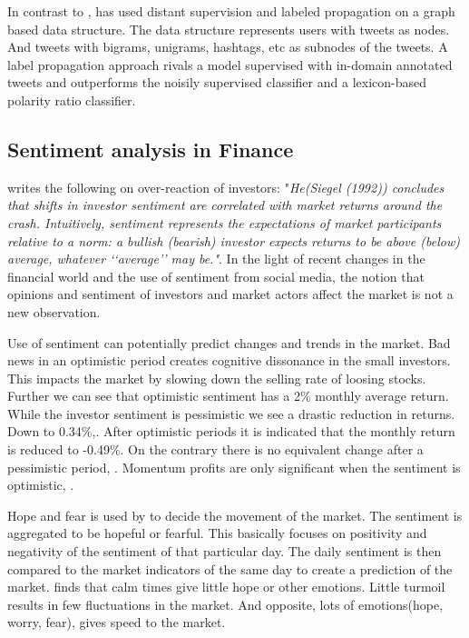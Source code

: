 In contrast to \cite[]{becker13}, \cite[]{sperious11} has used distant
supervision and labeled propagation on a graph based data structure. The data
structure represents users with tweets as nodes. And tweets with bigrams,
unigrams, hashtags, etc as subnodes of the tweets. A label propagation approach
rivals a model supervised with in-domain annotated tweets and outperforms the
noisily supervised classifier and a lexicon-based polarity ratio classifier.
\cite[]{sperious11} 

\subsection{Sentiment analysis in Finance}
\cite[p2]{Brown20041} writes the following on over-reaction of investors: 
"\textit{He(Siegel (1992)) concludes that shifts in investor sentiment are correlated
with market returns around the crash. Intuitively, sentiment represents the
expectations of market participants relative to a norm: a bullish (bearish)
investor expects returns to be above (below) average, whatever ‘‘average’’ may
be."}. 
In the light of recent changes in the financial world and the use
of sentiment from social media, the notion that opinions and sentiment of
investors and market actors affect the market is not a new observation.

Use of sentiment can potentially predict changes and trends in the market.
Bad news in an optimistic period creates cognitive dissonance in the small
investors. This impacts the market by slowing down the selling rate of loosing
stocks. \cite[p29]{doukas10:sentiment_and_momentum}
Further we can see that optimistic sentiment has a 2\% monthly average return.
While the investor sentiment is pessimistic we see a drastic reduction in
returns. Down to 0.34\%,\cite[p5]{doukas10:sentiment_and_momentum}.
After optimistic periods it is indicated that the monthly return is reduced to
-0.49\%. On the contrary there is no equivalent change after a pessimistic
period, \cite[p6-7]{doukas10:sentiment_and_momentum}.
Momentum profits are only significant when the sentiment is optimistic,
\cite[p29]{doukas10:sentiment_and_momentum}.

Hope and fear is used by \cite[]{Zhang201155} to decide the movement of the
market. The sentiment is aggregated to be hopeful or fearful. This basically
focuses on positivity and negativity of the sentiment of that particular day.
The daily sentiment is then compared to the market indicators of the same day
to create a prediction of the market. \cite[]{Zhang201155} finds that calm
times give little hope or other emotions. Little turmoil results in few
fluctuations in the market. And opposite, lots of emotions(hope, worry, fear),
gives speed to the market.

